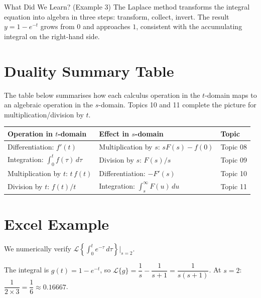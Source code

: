 \documentclass[12pt,a4paper]{article}
\begin{document}
\begin{learnbox}{What Did We Learn? (Example 3)}
The Laplace method transforms the integral equation into algebra in three steps:
transform, collect, invert. The result $y = 1 - e^{-t}$ grows from $0$ and approaches
$1$, consistent with the accumulating integral on the right-hand side.
\end{learnbox}

\section{Duality Summary Table}

The table below summarises how each calculus operation in the $t$-domain maps to an
algebraic operation in the $s$-domain. Topics 10 and 11 complete the picture for
multiplication/division by $t$.

\begin{center}
\begin{tabular}{p{5.5cm} p{5.5cm} p{3cm}}
\toprule
\textbf{Operation in $t$-domain} & \textbf{Effect in $s$-domain} & \textbf{Topic} \\
\midrule
Differentiation: $f'(t)$ &
  Multiplication by $s$: $sF(s) - f(0)$ & Topic 08 \\
\addlinespace
Integration: $\int_0^t f(\tau)\,d\tau$ &
  Division by $s$: $F(s)/s$ & Topic 09 \\
\addlinespace
Multiplication by $t$: $t\,f(t)$ &
  Differentiation: $-F'(s)$ & Topic 10 \\
\addlinespace
Division by $t$: $f(t)/t$ &
  Integration: $\int_s^\infty F(u)\,du$ & Topic 11 \\
\bottomrule
\end{tabular}
\end{center}

\section{Excel Example }

We numerically verify
$\mathcal{L}\!\left\{\int_0^t e^{-\tau}\,d\tau\right\}\Big|_{s=2}$.

The integral is $g(t) = 1 - e^{-t}$, so
$\mathcal{L}\{g\} = \dfrac{1}{s} - \dfrac{1}{s+1} = \dfrac{1}{s(s+1)}$.
At $s = 2$: $\dfrac{1}{2 \times 3} = \dfrac{1}{6} \approx 0.16667$.
\end{document}
